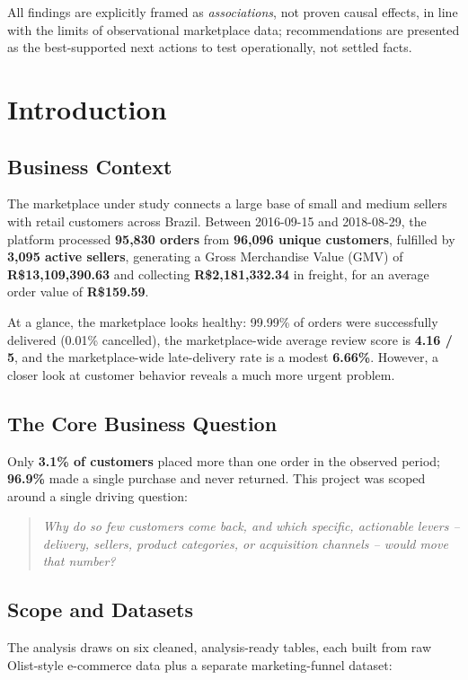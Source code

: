 \documentclass[11pt,a4paper]{report}
\begin{document}
All findings are explicitly framed as \textit{associations}, not proven causal effects, in line
with the limits of observational marketplace data; recommendations are presented as the
best-supported next actions to test operationally, not settled facts.

\clearpage

\chapter{Introduction}

\section{Business Context}
The marketplace under study connects a large base of small and medium sellers with retail
customers across Brazil. Between 2016-09-15 and 2018-08-29, the platform processed \textbf{95{,}830
orders} from \textbf{96{,}096 unique customers}, fulfilled by \textbf{3{,}095 active sellers},
generating a Gross Merchandise Value (GMV) of \textbf{R\$13{,}109{,}390.63} and collecting
\textbf{R\$2{,}181{,}332.34} in freight, for an average order value of \textbf{R\$159.59}.

At a glance, the marketplace looks healthy: 99.99\% of orders were successfully delivered
(0.01\% cancelled), the marketplace-wide average review score is \textbf{4.16 / 5}, and the
marketplace-wide late-delivery rate is a modest \textbf{6.66\%}. However, a closer look at customer
behavior reveals a much more urgent problem.

\section{The Core Business Question}
Only \textbf{3.1\% of customers} placed more than one order in the observed period; \textbf{96.9\%}
made a single purchase and never returned. This project was scoped around a single driving
question:

\begin{quote}
\textit{Why do so few customers come back, and which specific, actionable levers -- delivery,
sellers, product categories, or acquisition channels -- would move that number?}
\end{quote}

\section{Scope and Datasets}
The analysis draws on six cleaned, analysis-ready tables, each built from raw Olist-style
e-commerce data plus a separate marketing-funnel dataset:
\end{document}
